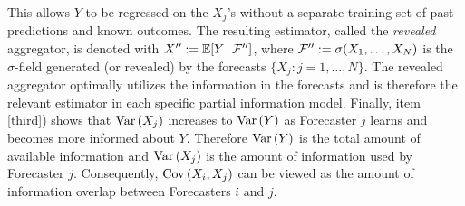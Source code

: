 \documentclass[11pt]{article}
\newcommand{\E}{\mathbb{E}}
\theoremstyle{definition}
\theoremstyle{definition}
\def\one{{\bf 1}}
\def\bSigma{{\bf \Sigma}}
\def\F{{\cal F}}
\def\G{{\cal G}}
\def\E{{\mathbb E}}
\def\Var{{\rm Var}\,}
\def\Cov{{\rm Cov}\,}
\def\|{\, | \,}
\begin{document}
This allows $Y$ to be regressed on the $X_j$'s without a separate training set of past predictions and known outcomes. The resulting estimator, called the \textit{revealed} aggregator, is denoted with $X'' := \E [Y \|
\F'']$, where $\F'' := \sigma(X_1, \dots, X_N)$ is the $\sigma$-field generated (or revealed) by the forecasts
$\{X_j : j = 1, \dots, N \}$. The revealed aggregator optimally utilizes the information in the forecasts and is therefore the relevant estimator in each specific partial information model. Finally, item \ref{third}) shows that $\Var(X_j)$ increases to $\Var(Y)$ as Forecaster $j$  learns and becomes more informed about $Y$. Therefore $\Var(Y)$ is the total amount of available information and $\Var(X_j)$ is the amount of information used by Forecaster $j$. 
 Consequently, $\Cov (X_{i} , X_{j})$ can be viewed as the amount of information overlap between Forecasters $i$ and
$j$. 






\end{document}
